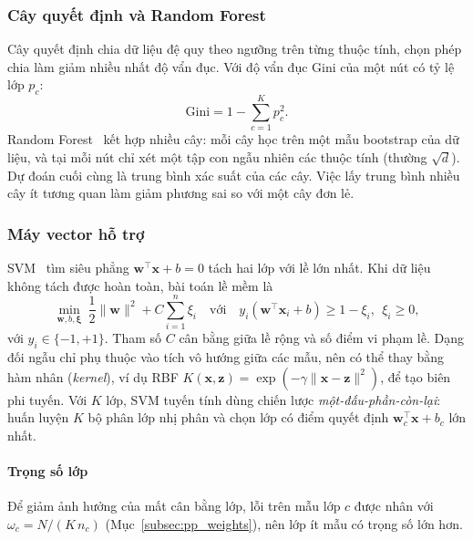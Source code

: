\subsubsection{Cây quyết định và Random Forest}
\label{subsubsec:rf}

Cây quyết định chia dữ liệu đệ quy theo ngưỡng trên từng thuộc tính, chọn phép chia làm giảm nhiều nhất độ vẩn đục. Với độ vẩn đục Gini của một nút có tỷ lệ lớp $p_c$:
\begin{equation}
  \mathrm{Gini} = 1-\sum_{c=1}^{K}p_c^2.
\end{equation}
Random Forest~\cite{han2022} kết hợp nhiều cây: mỗi cây học trên một mẫu bootstrap của dữ liệu, và tại mỗi nút chỉ xét một tập con ngẫu nhiên các thuộc tính (thường $\sqrt{d}$). Dự đoán cuối cùng là trung bình xác suất của các cây. Việc lấy trung bình nhiều cây ít tương quan làm giảm phương sai so với một cây đơn lẻ.

\subsubsection{Máy vector hỗ trợ}
\label{subsubsec:svm}

SVM~\cite{han2022} tìm siêu phẳng $\mathbf{w}^\top\mathbf{x}+b=0$ tách hai lớp với lề lớn nhất. Khi dữ liệu không tách được hoàn toàn, bài toán lề mềm là
\begin{equation}
  \min_{\mathbf{w},b,\boldsymbol{\xi}}\ \frac{1}{2}\|\mathbf{w}\|^2 + C\sum_{i=1}^{n}\xi_i
  \quad\text{với}\quad y_i(\mathbf{w}^\top\mathbf{x}_i+b)\ge 1-\xi_i,\ \ \xi_i\ge 0,
\end{equation}
với $y_i\in\{-1,+1\}$. Tham số $C$ cân bằng giữa lề rộng và số điểm vi phạm lề. Dạng đối ngẫu chỉ phụ thuộc vào tích vô hướng giữa các mẫu, nên có thể thay bằng hàm nhân (\textit{kernel}), ví dụ RBF $K(\mathbf{x},\mathbf{z})=\exp(-\gamma\|\mathbf{x}-\mathbf{z}\|^2)$, để tạo biên phi tuyến. Với $K$ lớp, SVM tuyến tính dùng chiến lược \emph{một-đấu-phần-còn-lại}: huấn luyện $K$ bộ phân lớp nhị phân và chọn lớp có điểm quyết định $\mathbf{w}_c^\top\mathbf{x}+b_c$ lớn nhất.

\paragraph*{Trọng số lớp} Để giảm ảnh hưởng của mất cân bằng lớp, lỗi trên mẫu lớp $c$ được nhân với $\omega_c = N/(K\,n_c)$ (Mục~\ref{subsec:pp_weights}), nên lớp ít mẫu có trọng số lớn hơn.


